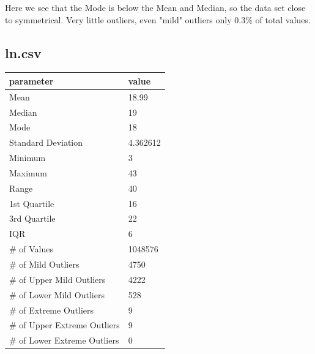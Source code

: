 \documentclass[10pt]{article}
\begin{document}
\par
{}%
\hfill
{}%
\par
Here we see that the Mode is below the Mean and Median, so the data set close to symmetrical. Very little outliers, even "mild" outliers only 0.3\% of total values. \subsection*{ln.csv}
\begin{table}[h!]
  \begin{center}
    \scriptsize
    \begin{tabular}{ll}
      \toprule
      parameter & value\\
      \midrule
 	Mean & 18.99\\
	Median & 19\\
	Mode & 18\\
	Standard Deviation & 4.362612\\
	Minimum & 3\\
	Maximum & 43\\
	Range & 40\\
	1st Quartile & 16\\
	3rd Quartile & 22\\
	IQR & 6\\   
	\# of Values & 1048576\\ 
	\# of Mild Outliers & 4750\\
	\# of Upper Mild Outliers & 4222\\
	\# of Lower Mild Outliers & 528\\
	\# of Extreme Outliers & 9\\
	\# of Upper Extreme Outliers & 9\\
	\# of Lower Extreme Outliers & 0\\
       \bottomrule
    \end{tabular}
  \end{center}
\end{table}
\end{document}
